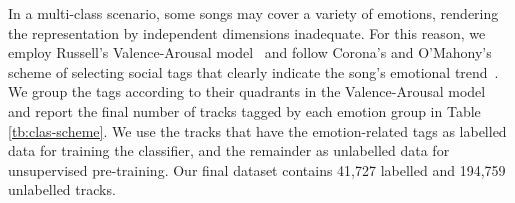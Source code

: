\documentclass{llncs}
\begin{document}
In a multi-class scenario, some songs may cover a variety of emotions, rendering the representation by independent dimensions inadequate. For this reason, we employ Russell's Valence-Arousal model~\cite{Russell1980} and follow Corona's and O'Mahony's scheme of selecting social tags that clearly indicate the song's emotional trend~\cite{Corona2015An}. %
We group the tags according to their quadrants in the Valence-Arousal model and report the final number of tracks tagged by each emotion group in Table \ref{tb:clas-scheme}. We use the tracks that have the emotion-related tags as labelled data for training the classifier, and the remainder as unlabelled data for unsupervised pre-training. %
Our final dataset contains 41,727 labelled and 194,759 unlabelled tracks.%

\end{document}
